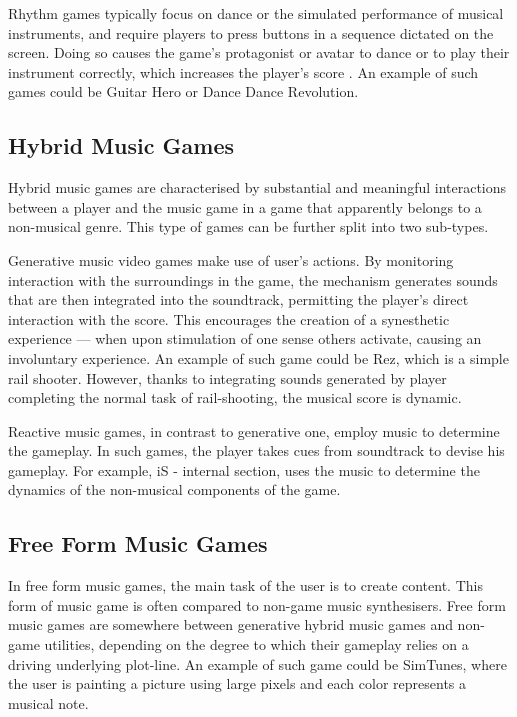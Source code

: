 Rhythm games typically focus on dance or the simulated performance of musical instruments, and require players to press buttons in a sequence dictated on the screen. Doing so causes the game's protagonist or avatar to dance or to play their instrument correctly, which increases the player's score \cite{rhythmgame}. An example of such games could be Guitar Hero or Dance Dance Revolution.

\vspace{10pt}


\subsection{Hybrid Music Games}

Hybrid music games are characterised by substantial and meaningful interactions between a player and the music game in a game that apparently belongs to a non-musical genre. This type of games can be further split into two sub-types.


Generative music video games make use of user’s actions. By monitoring interaction with the surroundings in the game, the mechanism generates sounds that are then integrated into the soundtrack, permitting the player’s direct interaction with the score. This encourages the creation of a synesthetic experience — when upon stimulation of one sense others activate, causing an involuntary experience. An example of such game could be Rez, which is a simple rail shooter. However, thanks to integrating sounds generated by player completing the normal task of rail-shooting, the musical score is dynamic.

Reactive music games, in contrast to generative one, employ music to determine the gameplay. In such games, the player takes cues from soundtrack to devise his gameplay. For example, iS - internal section, uses the music to determine the dynamics of the non-musical components of the game.

\vspace{10pt}


\subsection{Free Form Music Games}

In free form music games, the main task of the user is to create content. This form of music game is often compared to non-game music synthesisers. Free form music games are somewhere between generative hybrid music games and non-game utilities, depending on the degree to which their gameplay relies on a driving underlying plot-line. An example of such game could be SimTunes, where the user is painting a picture using large pixels and each color represents a musical note. 

